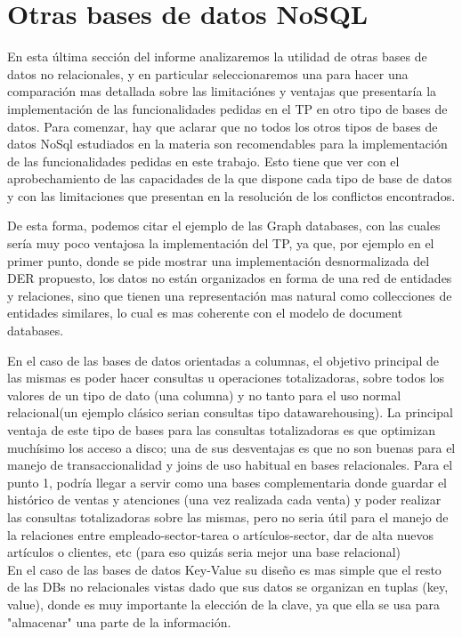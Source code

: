 \section{Otras bases de datos NoSQL}

En esta \'ultima secci\'on del informe analizaremos la utilidad de otras bases de datos no relacionales, y en particular seleccionaremos una para hacer una comparaci\'on mas detallada sobre las limitaci\'ones y ventajas que presentar\'ia la implementaci\'on de las funcionalidades pedidas en el TP en otro tipo de bases de datos. Para comenzar, hay que aclarar que no todos los otros tipos de bases de datos NoSql estudiados en la materia son recomendables para la implementaci\'on de las funcionalidades pedidas en este trabajo. Esto tiene que ver con el aprobechamiento de las capacidades de la que dispone cada tipo de base de datos y con las limitaciones que presentan en la resoluci\'on de los conflictos encontrados. 

De esta forma, podemos citar el ejemplo de las Graph databases, con las cuales ser\'ia muy poco ventajosa la implementaci\'on del TP, ya que, por ejemplo en el primer punto, donde se pide mostrar una implementaci\'on desnormalizada del DER propuesto, los datos no est\'an organizados en forma de una red de entidades y relaciones, sino que tienen una representaci\'on mas natural como collecciones de entidades similares, lo cual es mas coherente con el modelo de document databases.

En el caso de las bases de datos orientadas a columnas, el objetivo principal de las mismas es poder hacer consultas u operaciones totalizadoras, sobre todos los valores de un tipo de dato (una columna) y no tanto para el uso normal relacional(un ejemplo clásico serian consultas tipo datawarehousing). La principal ventaja de este tipo de bases para las consultas totalizadoras es que optimizan muchísimo los acceso a disco; una de sus desventajas es que no son buenas para el manejo de transaccionalidad y joins de uso habitual en bases relacionales.
Para el punto 1, podría llegar a servir como una bases complementaria donde guardar el histórico de ventas y atenciones (una vez realizada cada venta) y poder realizar las consultas totalizadoras sobre las mismas, pero no seria útil para el manejo de la relaciones entre empleado-sector-tarea o artículos-sector, dar de alta nuevos artículos o clientes, etc (para eso quizás seria mejor una base relacional) \\

En el caso de las bases de datos Key-Value su dise\~no es mas simple que el resto de las DBs no relacionales vistas dado que sus datos se organizan en tuplas (key, value), donde es muy importante la elecci\'on de la clave, ya que ella se usa para "almacenar" una parte de la informaci\'on. 

